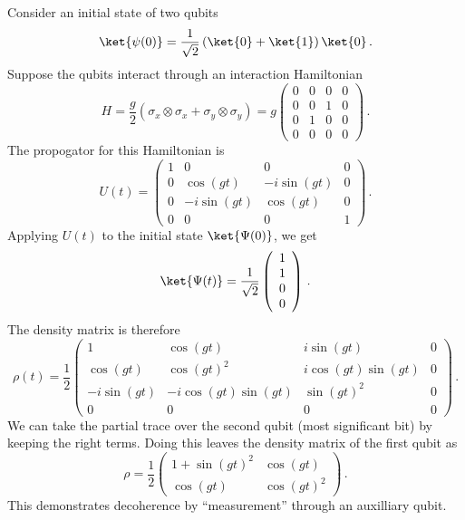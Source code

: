 Consider an initial state of two qubits
\begin{equation}
  \ket{\psi(0)} = \frac{1}{\sqrt{2}} \left( \ket{0} + \ket{1} \right)\ket{0} \, .
\end{equation}
Suppose the qubits interact through an interaction Hamiltonian
\begin{equation}
  H = \frac{g}{2} \left( \sigma_x \otimes \sigma_x + \sigma_y \otimes \sigma_y \right)
    = g \left(
        \begin{array}{cccc}
          0 & 0 & 0 & 0 \\
          0 & 0 & 1 & 0 \\
          0 & 1 & 0 & 0 \\
          0 & 0 & 0 & 0
        \end{array}
      \right)
    \, .
\end{equation}
The propogator for this Hamiltonian is
\begin{equation}
U(t) =
  \left(
  \begin{array}{cccc}
    1 & 0 & 0 & 0 \\
    0 & \cos(gt) & -i \sin(gt) & 0 \\
    0 & -i \sin(gt) & \cos(gt) & 0 \\
    0 & 0 & 0 & 1
  \end{array}
  \right)
  \, .
\end{equation}
Applying $U(t)$ to the initial state $\ket{\Psi(0)}$, we get
\begin{equation}
  \ket{\Psi(t)} =
  \frac{1}{\sqrt{2}}
  \left(
    \begin{array}{c}
      1 \\ 1 \\ 0 \\ 0
    \end{array}
  \right) \, .
\end{equation}
The density matrix is therefore
\begin{equation}
  \rho(t) = \frac{1}{2}
  \left(
  \begin{array}{cccc}
    1 & \cos(gt) & i \sin(gt) & 0 \\
    \cos(gt) & \cos(gt)^2 & i \cos(gt) \sin(gt) & 0 \\
    -i \sin(gt) & -i \cos(gt) \sin(gt) & \sin(gt)^2 & 0 \\
    0 & 0 & 0 & 0
  \end{array}
  \right) \, .
\end{equation}
We can take the partial trace over the second qubit (most significant bit) by keeping the right terms.
Doing this leaves the density matrix of the first qubit as
\begin{equation}
  \rho =
  \frac{1}{2}
  \left(
    \begin{array}{cc}
      1 + \sin(gt)^2 & \cos(gt) \\
      \cos(gt) & \cos(gt)^2
    \end{array}
  \right)
  \, .
\end{equation}
This demonstrates decoherence by ``measurement'' through an auxilliary qubit.
